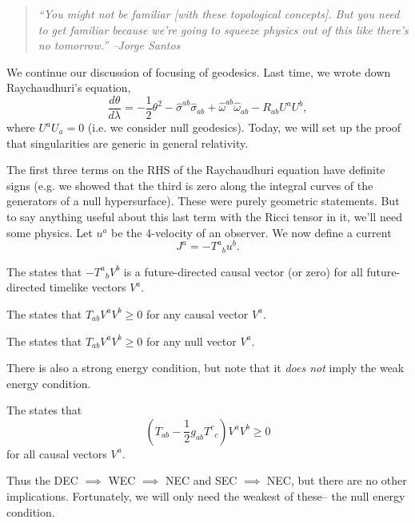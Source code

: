 \begin{quote}
    \textit{``You might not be familiar [with these topological concepts]. But you need to get familiar because we're going to squeeze physics out of this like there's no tomorrow.'' --Jorge Santos}
\end{quote}
We continue our discussion of focusing of geodesics. Last time, we wrote down Raychaudhuri's equation,
\begin{equation*}
    \frac{d\theta}{d\lambda}=-\frac{1}{2} \theta^2 -\hat\sigma^{ab} \hat\sigma_{ab}+\hat \omega^{ab} \hat \omega_{ab} - R_{ab} U^a U^b,
\end{equation*}
where $U^a U_a=0$ (i.e. we consider null geodesics). Today, we will set up the proof that singularities are generic in general relativity.

The first three terms on the RHS of the Raychaudhuri equation have definite signs (e.g. we showed that the third is zero along the integral curves of the generators of a null hypersurface). These were purely geometric statements. But to say anything useful about this last term with the Ricci tensor in it, we'll need some physics. 
Let $u^a$ be the 4-velocity of an observer. We now define a current
\begin{equation}
    J^a=-T^a{}_b u^b.
\end{equation}
\begin{defn}
    The  states that $-T^a{}_b V^b$ is a future-directed causal vector (or zero) for all future-directed timelike vectors $V^a.$
\end{defn}
\begin{defn}
    The  states that $T_{ab}V^a V^b \geq 0$ for any causal vector $V^a$.
\end{defn}
\begin{defn}
    The  states that $T_{ab}V^a V^b \geq 0$ for any null vector $V^a.$
\end{defn}
There is also a strong energy condition, but note that it \emph{does not} imply the weak energy condition.
\begin{defn}
    The  states that
    \begin{equation}
        (T_{ab}-\frac{1}{2}g_{ab}T^c{}_c)V^a V^b \geq 0
    \end{equation}
    for all causal vectors $V^a$.
\end{defn}
Thus the DEC $\implies$ WEC $\implies$ NEC and SEC $\implies$ NEC, but there are no other implications. Fortunately, we will only need the weakest of these-- the null energy condition.

